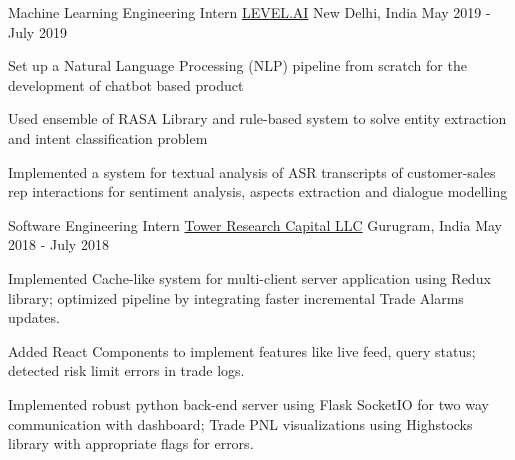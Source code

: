 

\begin{cventries}
  \cventry
    {Machine Learning Engineering Intern} %
    {\href{https://thelevel.ai/}{LEVEL.AI}} %
    {New Delhi, India} %
    {May 2019 - July 2019} %
    {
      \begin{cvitems} %
        \item {Set up a Natural Language Processing (NLP) pipeline from scratch for the development of chatbot based product}
        \item {Used ensemble of RASA Library and rule-based system to solve entity extraction and intent classification problem}
        \item {Implemented a system for textual analysis of ASR transcripts of customer-sales rep interactions for sentiment analysis, aspects extraction and dialogue modelling}
      \end{cvitems}
    }

  \cventry
    {Software Engineering Intern} %
    {\href{https://www.tower-research.com/}{Tower Research Capital LLC}} %
    {Gurugram, India} %
    {May 2018 - July 2018} %
    {
      \begin{cvitems} %
        \item {Implemented Cache-like system for multi-client server application using Redux library; optimized pipeline by integrating faster incremental Trade Alarms updates.}
        \item {Added React Components to implement features like live feed, query status; detected risk limit errors in trade logs.}
        \item {Implemented robust python back-end server using Flask SocketIO for two way communication with dashboard; Trade PNL visualizations using Highstocks library with appropriate flags for errors.}
      \end{cvitems}
    }


\end{cventries}
